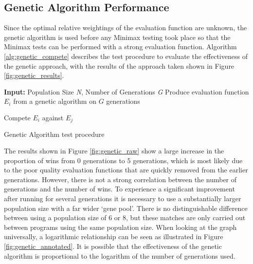 \documentclass[12pt,a4paper]{article}
\begin{document}
\subsection{Genetic Algorithm Performance}

Since the optimal relative weightings of the evaluation function are unknown, the genetic algorithm is used before any Minimax testing took place so that the Minimax tests can be performed with a strong evaluation function. Algorithm \ref{alg:genetic_compete} describes the test procedure to evaluate the effectiveness of the genetic approach, with the results of the approach taken shown in Figure \ref{fig:genetic_results}.

\begin{algorithm}[H]
\begin{algorithmic}[1]

\STATE \textbf{Input:} Population Size \textit{N}, Number of Generations \textit{G}
	\STATE Produce evaluation function $E_i$ from a genetic algorithm on $G$ generations
\ENDFOR

		\STATE Compete $E_i$ against $E_j$
	\ENDFOR
\ENDFOR

\end{algorithmic}
\caption{Genetic Algorithm test procedure}
\label{alg:genetic_compete}
\end{algorithm}


The results shown in Figure \ref{fig:genetic_raw} show a large increase in the proportion of wins from 0 generations to 5 generations, which is most likely due to the poor quality evaluation functions that are quickly removed from the earlier generations. However, there is not a strong correlation between the number of generations and the number of wins. To experience a significant improvement after running for several generations it is necessary to use a substantially larger population size with a far wider `gene pool'. There is no distinguishable difference between using a population size of 6 or 8, but these matches are only carried out between programs using the same population size. When looking at the graph universally, a logarithmic relationship can be seen as illustrated in Figure \ref{fig:genetic_annotated}. It is possible that the effectiveness of the genetic algorithm is proportional to the logarithm of the number of generations used.

\end{document}
